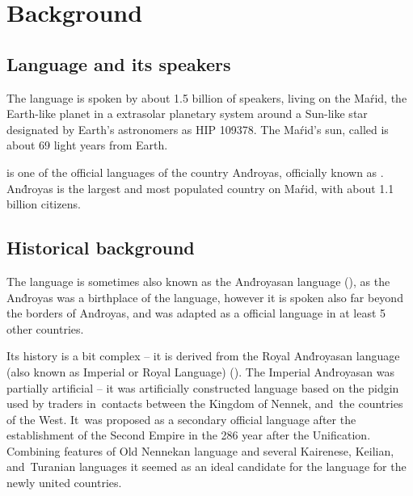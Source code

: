 \chapter{Background}
\label{ch:background}

\section{Language and its speakers}

The \andro language is spoken by about 1.5 billion of speakers, living on the
Maŕid, the Earth-like planet in a extrasolar planetary system around a Sun-like
star designated by Earth's astronomers as HIP 109378. The Maŕid's sun, called
 is about 69 light years from Earth.

\skipline

\andro is one of the official languages of the country And́royas, officially
known as . And́royas is the
largest and most populated country on Maŕid, with about 1.1 billion citizens.

\section{Historical background}

The language \andro is sometimes also known as the And́royasan language
(), as the And́royas was a
birthplace of the language, however it is spoken also far beyond the borders of
And́royas, and was adapted as a official language in at least 5 other countries.

Its history is a bit complex -- it is derived from the Royal And́royasan
language (also known as Imperial or Royal Language) (). The Imperial And́royasan was partially artificial -- it was
artificially constructed language based on the pidgin used by traders
in~contacts between the Kingdom of Nennek, and~the countries of the West. It~was
proposed as a secondary official language after the establishment of the Second
Empire in the 286 year after the Unification. Combining features of Old Nennekan
language and several Kairenese, Keilian, and~Turanian languages it seemed as an
ideal candidate for the language for the newly united countries.

